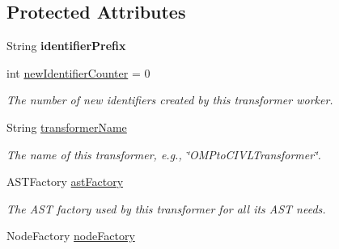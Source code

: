 \subsection*{Protected Attributes}
\begin{DoxyCompactItemize}
\item 
\hypertarget{classedu_1_1udel_1_1cis_1_1vsl_1_1civl_1_1transform_1_1common_1_1BaseWorker_a9fb909383f658d60661eaca302088133}{}String {\bfseries identifier\+Prefix}\label{classedu_1_1udel_1_1cis_1_1vsl_1_1civl_1_1transform_1_1common_1_1BaseWorker_a9fb909383f658d60661eaca302088133}

\item 
\hypertarget{classedu_1_1udel_1_1cis_1_1vsl_1_1civl_1_1transform_1_1common_1_1BaseWorker_ae73608de16f709bfae7316d25b729ff4}{}int \hyperlink{classedu_1_1udel_1_1cis_1_1vsl_1_1civl_1_1transform_1_1common_1_1BaseWorker_ae73608de16f709bfae7316d25b729ff4}{new\+Identifier\+Counter} = 0\label{classedu_1_1udel_1_1cis_1_1vsl_1_1civl_1_1transform_1_1common_1_1BaseWorker_ae73608de16f709bfae7316d25b729ff4}

\begin{DoxyCompactList}\small\item\em The number of new identifiers created by this transformer worker. \end{DoxyCompactList}\item 
String \hyperlink{classedu_1_1udel_1_1cis_1_1vsl_1_1civl_1_1transform_1_1common_1_1BaseWorker_ac0c58f181ddacf06a1b997857d8641ab}{transformer\+Name}
\begin{DoxyCompactList}\small\item\em The name of this transformer, e.\+g., \char`\"{}\+O\+M\+Pto\+C\+I\+V\+L\+Transformer\char`\"{}. \end{DoxyCompactList}\item 
\hypertarget{classedu_1_1udel_1_1cis_1_1vsl_1_1civl_1_1transform_1_1common_1_1BaseWorker_a44812bb476e4511fb6ca29a808427186}{}A\+S\+T\+Factory \hyperlink{classedu_1_1udel_1_1cis_1_1vsl_1_1civl_1_1transform_1_1common_1_1BaseWorker_a44812bb476e4511fb6ca29a808427186}{ast\+Factory}\label{classedu_1_1udel_1_1cis_1_1vsl_1_1civl_1_1transform_1_1common_1_1BaseWorker_a44812bb476e4511fb6ca29a808427186}

\begin{DoxyCompactList}\small\item\em The A\+S\+T factory used by this transformer for all its A\+S\+T needs. \end{DoxyCompactList}\item 
\hypertarget{classedu_1_1udel_1_1cis_1_1vsl_1_1civl_1_1transform_1_1common_1_1BaseWorker_a699b2a2571447faac2c963bd6772d880}{}Node\+Factory \hyperlink{classedu_1_1udel_1_1cis_1_1vsl_1_1civl_1_1transform_1_1common_1_1BaseWorker_a699b2a2571447faac2c963bd6772d880}{node\+Factory}\label{classedu_1_1udel_1_1cis_1_1vsl_1_1civl_1_1transform_1_1common_1_1BaseWorker_a699b2a2571447faac2c963bd6772d880}


\end{DoxyCompactItemize}
